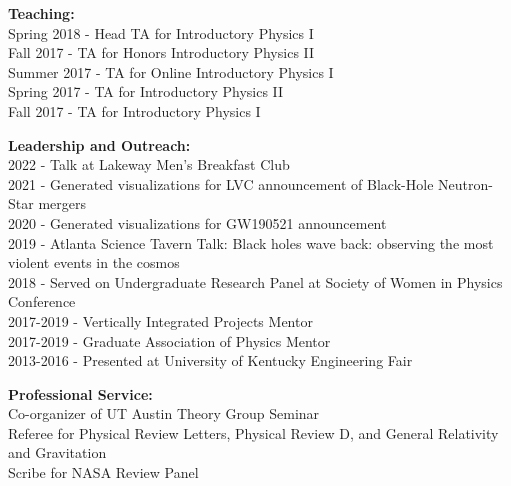 \documentclass[11pt]{article}
\begin{document}
\begin{flushleft}
  \textbf{Teaching:}\\
  Spring 2018 - Head TA for Introductory Physics I\\
  Fall 2017 - TA for Honors Introductory Physics II\\
  Summer 2017 - TA for Online Introductory Physics I\\
  Spring 2017 - TA for Introductory Physics II\\
  Fall 2017 - TA for Introductory Physics I\\
 
  \vspace{8px}   
 
  \textbf{Leadership and Outreach:}\\
  2022 - Talk at Lakeway Men's Breakfast Club\\
  2021 - Generated visualizations for LVC announcement of Black-Hole Neutron-Star mergers\\
  2020 - Generated visualizations for GW190521 announcement\\
  2019 - Atlanta Science Tavern Talk: Black holes wave back: observing the most violent events in the cosmos\\
  2018 - Served on Undergraduate Research Panel at Society of Women in Physics Conference\\
  2017-2019 - Vertically Integrated Projects Mentor\\
  2017-2019 - Graduate Association of Physics Mentor\\
  2013-2016 - Presented at University of Kentucky Engineering Fair\\

  \vspace{8px}

  \textbf{Professional Service: }\\
  Co-organizer of UT Austin Theory Group Seminar\\
  Referee for Physical Review Letters, Physical Review D,  and General Relativity and Gravitation\\
  Scribe for NASA Review Panel\\
  
\end{flushleft}
\end{document}
